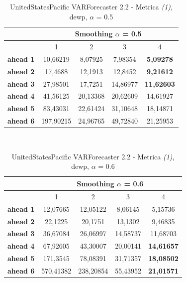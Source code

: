 \documentclass[12pt,a4paper,oneside,openright]{book}
\begin{document}
\begin{table}[H]
\centering
\begin{tabular}{|c|c|c|c|c|}
\hline
 & \multicolumn{4}{|c|}{Smoothing $\alpha$ = 0.5} \\
\hline
& 1 & 2 & 3 & 4 \\
\hline
\textbf{ahead 1} & 10,66219 & 8,07925 & 7,98354 & \textbf{5,09278} \\
\hline
\textbf{ahead 2} & 17,4688 & 12,1913 & 12,8452 & \textbf{9,21612}\\ 
\hline
\textbf{ahead 3} & 27,98501 & 17,7251 & 14,86977 & \textbf{11,62603}\\
\hline
\textbf{ahead 4} & 41,56125 & 20,13368 & 20,62609 & 14,61927\\ 
\hline
\textbf{ahead 5} & 83,43031 & 22,61424 & 31,10648 & 18,14871\\
\hline
\textbf{ahead 6} & 197,90215 & 24,96765 & 49,72840 & 21,25953\\ 
\hline
\end{tabular} \\
\caption{UnitedStatesPacific VARForecaster 2.2 - Metrica \textit{(1)}, dewp, $\alpha$ = 0.5}
\end{table} 

\medskip

\begin{table}[H]
\centering
\begin{tabular}{|c|c|c|c|c|}
\hline
 & \multicolumn{4}{|c|}{Smoothing $\alpha$ = 0.6} \\
\hline
& 1 & 2 & 3 & 4 \\
\hline
\textbf{ahead 1} & 12,07665 & 12,05122 & 8,06145 & 5,15736 \\
\hline
\textbf{ahead 2} & 22,1225 & 20,1751 & 13,1302 & 9,46835 \\ 
\hline
\textbf{ahead 3} & 36,67084 & 26,06997 & 14,58737 & 11,68703\\
\hline
\textbf{ahead 4} & 67,92605 & 43,30007 & 20,00141 & \textbf{14,61657}\\ 
\hline
\textbf{ahead 5} & 171,3545 & 78,08391 & 31,71357 & \textbf{18,08502}\\
\hline
\textbf{ahead 6} & 570,41382 & 238,20854 & 55,43952 & \textbf{21,01571}\\ 
\hline
\end{tabular} \\
\caption{UnitedStatesPacific VARForecaster 2.2 - Metrica \textit{(1)}, dewp, $\alpha$ = 0.6}
\end{table} 
\end{document}
